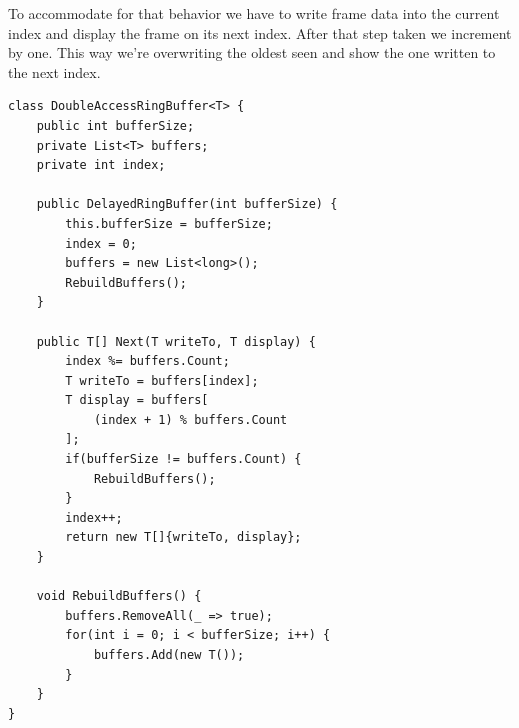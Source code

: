 To accommodate for that behavior we have to write frame data into the  current 
index and display the frame on its next index. After that step taken we 
increment by one. This way we’re overwriting the oldest seen 
 and show the one written to the next index.

\begin{lstlisting}
class DoubleAccessRingBuffer<T> {
	public int bufferSize;
	private List<T> buffers;
	private int index;
	
	public DelayedRingBuffer(int bufferSize) {
		this.bufferSize = bufferSize;
		index = 0;
		buffers = new List<long>();
		RebuildBuffers();
	}
	
	public T[] Next(T writeTo, T display) {
		index %= buffers.Count;
		T writeTo = buffers[index];
		T display = buffers[
			(index + 1) % buffers.Count
		];
		if(bufferSize != buffers.Count) {
			RebuildBuffers();
		}
		index++;
		return new T[]{writeTo, display};
	}
	
	void RebuildBuffers() {
		buffers.RemoveAll(_ => true);
		for(int i = 0; i < bufferSize; i++) {
			buffers.Add(new T());
		}
	}
}
\end{lstlisting}

